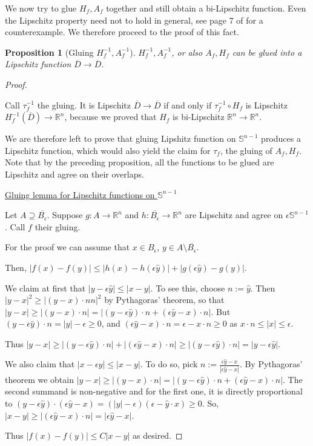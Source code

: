 \documentclass[english,a4paper,9pt,oneside]{scrbook}	%
\theoremstyle{break}
\newtheorem{prop}[equation]{Proposition}
\newenvironment{mproof}[1][\proofname]{%
  \begin{proof}[#1]$ $\par\nobreak\ignorespaces
}{%
  \end{proof}
}
\renewcommand*{\proofname}{Proof}
\theoremstyle{remark}
\newcommand{\mR}{\mathbb{R}}
\newcommand{\mS}{\mathbb{S}^{n-1}}
\newcommand{\yh}{\hat{y}}
\newcommand{\eps}{\epsilon}
\begin{document}
We now try to glue $H_f, A_f$ together and still obtain a bi-Lipschitz function. Even the Lipschitz property need not to hold in general, see page 7 of \cite{weaver} for a counterexample. We therefore proceed to the proof of this fact.

\begin{prop}[Gluing $H_f^{-1}, A_f^{-1}$]
\label{prop:gluing}
$H_f^{-1}, A_f^{-1}$, or also $A_f, H_f$ can be glued into a Lipschitz function $\overline{D}\rightarrow\overline{D}$.
\end{prop}
\begin{mproof}

Call $\tau_f^{-1}$ the gluing. It is Lipschitz $\overline{D}\rightarrow\overline{D}$ if and only if $\tau_f^{-1}\circ H_f$ is Lipschitz $H_f^{-1}(\overline{D})\rightarrow\mR^n$, because we proved that $H_f$ is bi-Lipschitz $\mR^n \rightarrow \mR^n$.

We are therefore left to prove that gluing Lipshitz function on $\mS$ produces a Lipschitz function, which would also yield the claim for $\tau_f$, the gluing of $A_f, H_f$. Note that by the preceding proposition, all the functions to be glued are Lipschitz and agree on their overlaps.

\underline{Gluing lemma for Lipschitz functions on $\mS$}

Let $A\supseteq \overline{B_\eps}$. Suppose $g:A\rightarrow\mR^n$ and $h:\overline{B_\eps}\rightarrow\mR^n$ are Lipschitz and agree on $\eps \mS$. Call $f$ their gluing.

For the proof we can assume that $x \in B_\eps$, $y \in A \setminus \overline{B_\eps}$.

Then, $|f(x)-f(y)|\leq |h(x)-h(\eps \yh)|+|g(\eps \yh)-g(y)|$.

We claim at first that $|y-\eps \yh|\leq  |x-y|$. To see this, choose $n:=\yh$. Then $|y-x|^2 \geq |(y-x)\cdot n n|^2$ by Pythagoras' theorem, so that $|y-x|\geq |(y-x)\cdot n| = |(y-\eps \yh)\cdot n + (\eps \yh -x)\cdot n|$. But $(y-\eps \yh)\cdot n=|y|-\eps \geq 0$, and $(\eps \yh -x)\cdot n = \eps - x\cdot n\geq 0 $ as $x\cdot n \leq |x|\leq \eps$.

Thus  $|y-x|\geq |(y-\eps \yh)\cdot n| + |(\eps \yh -x)\cdot n|\geq  |(y-\eps \yh)\cdot n|=|y-\eps \yh|$.

We also claim that $|x-\eps \yh|\leq |x-y|$. To do so, pick $n:=\frac{\eps\yh -x}{|\eps\yh-x|}$. By Pythagoras' theorem we obtain $|y-x|\geq |(y-x)\cdot n|=|(y-\eps \yh)\cdot n +(\eps \yh -x)\cdot n|$. The second summand is non-negative and for the first one, it is directly proportional to $(y-\eps \yh)\cdot(\eps \yh-x)=(|y|-\eps)(\eps-\yh\cdot x)\geq 0$. So, $|x-y|\geq |(\eps \yh -x)\cdot n|=|\eps \yh -x|$.

Thus $ |f(x)-f(y)|\leq C|x-y|$ as desired.


\end{mproof}
\end{document}
